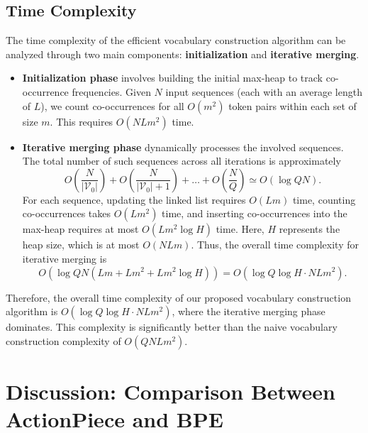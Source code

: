 \subsection{Time Complexity}

The time complexity of the efficient vocabulary construction algorithm can be analyzed through two main components: \textbf{initialization} and \textbf{iterative merging}.

\begin{itemize}  
   \item \textbf{Initialization phase}  
   involves building the initial max-heap to track co-occurrence frequencies. Given \(N\) input sequences (each with an average length of \(L\)), we count co-occurrences for all \(O(m^2)\) token pairs within each set of size \(m\). This requires \(O(NLm^2)\) time.  

   \item \textbf{Iterative merging phase}
   dynamically processes the involved sequences. The total number of such sequences across all iterations is approximately  
   \[
   O\left(\frac{N}{|\mathcal{V}_0|}\right) + O\left(\frac{N}{|\mathcal{V}_0| + 1}\right) + \dots + O\left(\frac{N}{Q}\right) \simeq O(\log{Q}N).
   \]  
   For each sequence, updating the linked list requires \(O(Lm)\) time, counting co-occurrences takes \(O(Lm^2)\) time, and inserting co-occurrences into the max-heap requires at most \(O(Lm^2\log{H})\) time. Here, \(H\) represents the heap size, which is at most \(O(NLm)\). Thus, the overall time complexity for iterative merging is  
   \[
   O(\log{Q}N(Lm + Lm^2 + Lm^2\log{H})) = O(\log{Q}\log{H} \cdot NLm^2).
   \]  
\end{itemize}  

Therefore, the overall time complexity of our proposed vocabulary construction algorithm is \(O(\log{Q}\log{H} \cdot NLm^2)\), where the iterative merging phase dominates. This complexity is significantly better than the naive vocabulary construction complexity of \(O(QNLm^2)\).  

\section{Discussion: Comparison Between ActionPiece and BPE}

